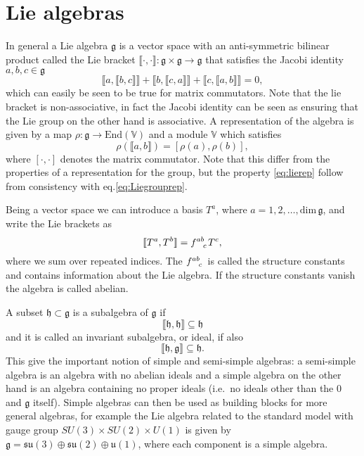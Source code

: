 \section{Lie algebras}\label{sec:Liealgebras}
In general a Lie algebra $\mathfrak{g}$ is a vector space with an anti-symmetric bilinear product called the Lie bracket $\llbracket\cdot,\cdot\rrbracket: \mathfrak{g}\times\mathfrak{g}\to\mathfrak{g}$ that satisfies the Jacobi identity $a,b,c\in\mathfrak{g}$
\begin{equation}
\llbracket a,\llbracket b,c\rrbracket\rrbracket+\llbracket b,\llbracket c,a\rrbracket\rrbracket+\llbracket c,\llbracket a,b\rrbracket\rrbracket=0, 
\end{equation}
which can easily be seen to be true for matrix commutators. Note that the lie bracket is non-associative, in fact the Jacobi identity can be seen as ensuring that the Lie group on the other hand is associative. A representation of the algebra is given by a map $\rho: \mathfrak{g}\to \text{End}(\mathbb{V})$ and a module $\mathbb{V}$ which satisfies
\begin{equation}\label{eq:lierep}
    \rho(\llbracket a,b\rrbracket) = [\rho(a),\rho(b)],
\end{equation}
where $[\cdot,\cdot]$ denotes the matrix commutator. Note that this differ from the properties of a representation for the group, but the property \eqref{eq:lierep} follow from consistency with eq.\eqref{eq:Liegrouprep}.

Being a vector space we can introduce a basis $T^a$, where $a=1,2,\ldots,\text{dim}\,\mathfrak{g}$, and write the Lie brackets as 
\begin{equation}
    \llbracket T^a,T^b\rrbracket = \tensor{f}{^{ab}_c} T^c,
\end{equation}
where we sum over repeated indices. The $\tensor{f}{^{ab}_c}$ is called the structure constants and contains information about the Lie algebra. If the structure constants vanish the algebra is called abelian.

A subset $\mathfrak{h}\subset \mathfrak{g}$ is a subalgebra of $\mathfrak{g}$ if \begin{equation}
    \llbracket\mathfrak{h},\mathfrak{h}\rrbracket\subseteq \mathfrak{h}
\end{equation} 
and it is called an invariant subalgebra, or ideal, if also
\begin{equation}
    \llbracket\mathfrak{h},\mathfrak{g}\rrbracket\subseteq \mathfrak{h}.
\end{equation}
This give the important notion of simple and semi-simple algebras: a semi-simple algebra is an algebra with no abelian ideals and a simple algebra on the other hand is an algebra containing no proper ideals (i.e.\ no ideals other than the ${0}$ and $\mathfrak{g}$ itself). Simple algebras can then be used as building blocks for more general algebras, for example the Lie algebra related to the standard model with gauge group $SU(3)\times SU(2)\times U(1)$ is given by $\mathfrak{g}=\mathfrak{su}(3)\oplus\mathfrak{su}(2)\oplus\mathfrak{u}(1)$, where each component is a simple algebra. 

